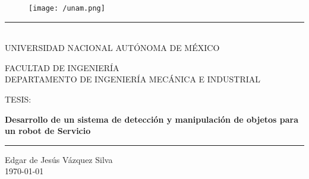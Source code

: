 \documentclass[a4paper, openright, 12pt]{report}
\begin{document}
\begin{titlepage}

	\begin{center}
		\vspace*{-1in}
		\begin{figure}[htb]
			\begin{center}
			\texttt{[image: /unam.png]}
			\end{center}
		\end{figure}
		\vspace*{0.35in}

		\begin{large}
			\rule{130mm}{0.1mm}\\
			UNIVERSIDAD NACIONAL AUTÓNOMA DE MÉXICO
		\end{large}
		\vspace*{0.55in}

		FACULTAD DE INGENIERÍA \\
		\vspace*{0.25in}
		DEPARTAMENTO DE INGENIERÍA MECÁNICA E INDUSTRIAL\\
		\vspace*{0.6in}
		\begin{large}
			TESIS:\\
		\end{large}
		\vspace*{0.2in}

		\begin{Large}
			\textbf{ Desarrollo de un sistema de detección y manipulación de objetos para un robot de Servicio} \\
		\end{Large}
		\vspace*{0.65in}

		\rule{110mm}{0.1mm}

		\vspace*{0.35in}
		\begin{large}
			Edgar de Jesús Vázquez Silva \\
			\vspace*{0.55in}
			\today
		\end{large}


	\end{center}

\end{titlepage}



\tableofcontents{}


\newpage{}













\newpage{}




\end{document}
